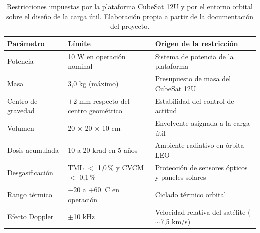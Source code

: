 \begin{table}[H]
\centering
\begin{threeparttable}
\caption{Restricciones impuestas por la plataforma CubeSat 12U y por el
entorno orbital sobre el diseño de la carga útil. Elaboración propia a partir de
la documentación del proyecto.\vspace{1ex}}
\small
\begin{tabularx}{\textwidth}{@{}l l X@{}}
\toprule
\textbf{Parámetro} & \textbf{Límite} & \textbf{Origen de la restricción} \\
\midrule
Potencia            & 10 W en operación nominal & Sistema de potencia de la plataforma \\
Masa                & 3,0 kg (máximo)           & Presupuesto de masa del CubeSat 12U \\
Centro de gravedad  & $\pm$2 mm respecto del centro geométrico & Estabilidad del control de actitud \\
Volumen             & 20 $\times$ 20 $\times$ 10 cm & Envolvente asignada a la carga útil \\
Dosis acumulada     & 10 a 20 krad en 5 años    & Ambiente radiativo en órbita LEO \\
Desgasificación     & TML $<$ 1,0\,\% y CVCM $<$ 0,1\,\% & Protección de sensores ópticos y paneles solares \\
Rango térmico       & $-20$ a $+60\ ^{\circ}$C en operación & Ciclado térmico orbital \\
Efecto Doppler      & $\pm$10 kHz                & Velocidad relativa del satélite ($\sim$7,5 km/s) \\
\bottomrule
\end{tabularx}
\end{threeparttable}
\end{table}



